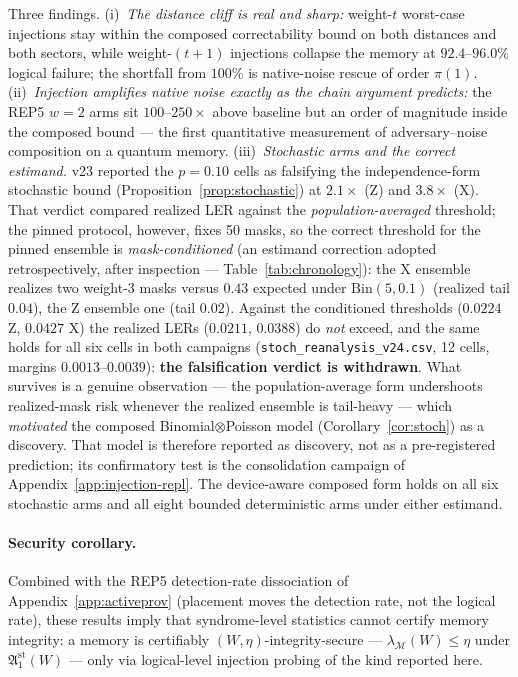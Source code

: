 \documentclass[11pt,a4paper]{article}
\begin{document}
Three findings. (i)~\emph{The distance cliff is real and sharp:}
weight-$t$ worst-case injections stay within the composed
correctability bound on both distances and both sectors, while
weight-$(t{+}1)$ injections collapse the memory at $92.4$--$96.0\%$
logical failure; the shortfall from $100\%$ is native-noise rescue of
order $\pi(1)$. (ii)~\emph{Injection amplifies native noise exactly as
the chain argument predicts:} the REP5 $w{=}2$ arms sit
$100$--$250\times$ above baseline but an order of magnitude inside the
composed bound --- the first quantitative measurement of
adversary--noise composition on a quantum memory.
(iii)~\emph{Stochastic arms and the correct estimand.} v23 reported the
$p{=}0.10$ cells as falsifying the independence-form stochastic bound
(Proposition~\ref{prop:stochastic}) at $2.1\times$ (Z) and $3.8\times$
(X). That verdict compared realized LER against the
\emph{population-averaged} threshold; the pinned protocol,
however, fixes 50 masks, so the correct threshold for the pinned
ensemble is
\emph{mask-conditioned} (an estimand correction adopted retrospectively,
after inspection --- Table~\ref{tab:chronology}): the X ensemble
realizes two weight-3 masks
versus $0.43$ expected under $\mathrm{Bin}(5,0.1)$ (realized tail
$0.04$), the Z ensemble one (tail $0.02$). Against the conditioned
thresholds ($0.0224$ Z, $0.0427$ X) the realized LERs ($0.0211$,
$0.0388$) do \emph{not} exceed, and the same holds for all six cells in
both campaigns (\texttt{stoch\_reanalysis\_v24.csv}, 12 cells, margins
$0.0013$--$0.0039$): \textbf{the falsification verdict is withdrawn}.
What survives is a genuine observation --- the population-average form
undershoots realized-mask risk whenever the realized ensemble is
tail-heavy --- which \emph{motivated} the composed
Binomial$\otimes$Poisson model (Corollary~\ref{cor:stoch}) as a
discovery. That model is therefore reported as discovery, not as a
pre-registered prediction; its confirmatory test is the consolidation
campaign of Appendix~\ref{app:injection-repl}. The device-aware composed
form holds on all six stochastic arms and all eight bounded
deterministic arms under either estimand.

\paragraph{Security corollary.}
Combined with the REP5 detection-rate dissociation of
Appendix~\ref{app:activeprov} (placement moves the detection rate, not
the logical rate), these results imply that syndrome-level statistics
cannot certify memory integrity: a memory is certifiably
$(W,\eta)$-integrity-secure --- $\lambda_{\mathcal{M}}(W)\le\eta$ under
$\mathfrak{A}_1^{\mathrm{st}}(W)$ --- only via logical-level injection
probing of the kind reported here.
\end{document}
